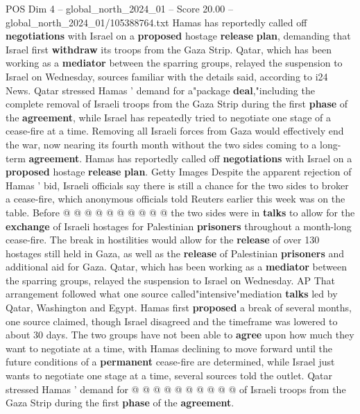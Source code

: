\begin{textsample}{POS Dim 4 – global\_north\_2024\_01 – Score 20.00 – global\_north\_2024\_01/105388764.txt}  \label{ex:f4_pos_334}
Hamas has reportedly called off \textbf{negotiations} with Israel on a \textbf{proposed} hostage \textbf{release} \textbf{plan}, demanding that Israel first \textbf{withdraw} its troops from the Gaza Strip.
Qatar, which has been working as a \textbf{mediator} between the sparring groups, relayed the suspension to Israel on Wednesday, sources familiar with the details said, according to i24 News.
Qatar stressed Hamas ' demand for a"package \textbf{deal},"including the complete removal of Israeli troops from the Gaza Strip during the first \textbf{phase} of the \textbf{agreement}, while Israel has repeatedly tried to negotiate one stage of a cease-fire at a time.
Removing all Israeli forces from Gaza would effectively end the war, now nearing its fourth month without the two sides coming to a long-term \textbf{agreement}.
Hamas has reportedly called off \textbf{negotiations} with Israel on a \textbf{proposed} hostage \textbf{release} \textbf{plan}.
Getty Images Despite the apparent rejection of Hamas ' bid, Israeli officials say there is still a chance for the two sides to broker a cease-fire, which anonymous officials told Reuters earlier this week was on the table.
Before @ @ @ @ @ @ @ @ @ @ the two sides were in \textbf{talks} to allow for the \textbf{exchange} of Israeli hostages for Palestinian \textbf{prisoners} throughout a month-long cease-fire.
The break in hostilities would allow for the \textbf{release} of over 130 hostages still held in Gaza, as well as the \textbf{release} of Palestinian \textbf{prisoners} and additional aid for Gaza.
Qatar, which has been working as a \textbf{mediator} between the sparring groups, relayed the suspension to Israel on Wednesday.
AP That arrangement followed what one source called"intensive"mediation \textbf{talks} led by Qatar, Washington and Egypt.
Hamas first \textbf{proposed} a break of several months, one source claimed, though Israel disagreed and the timeframe was lowered to about 30 days.
The two groups have not been able to \textbf{agree} upon how much they want to negotiate at a time, with Hamas declining to move forward until the future conditions of a \textbf{permanent} cease-fire are determined, while Israel just wants to negotiate one stage at a time, several sources told the outlet.
Qatar stressed Hamas ' demand for @ @ @ @ @ @ @ @ @ @ of Israeli troops from the Gaza Strip during the first \textbf{phase} of the \textbf{agreement}.

\end{textsample}
